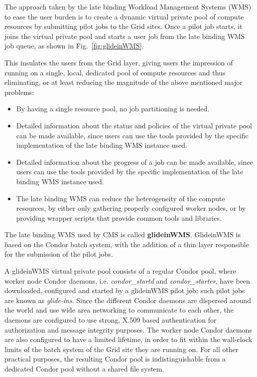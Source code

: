 \documentclass[a4paper]{jpconf}
\begin{document}
The approach taken by the late binding Workload Management Systems (WMS) to ease the user burden is 
to create a dynamic virtual private pool of compute resources by submitting pilot jobs to the Grid sites.
Once a pilot job starts, it joins the virtual private pool and starts a user job from the late binding WMS job queue, 
as shown in Fig.~\ref{fig:glideinWMS}.

This insulates the users from the Grid layer, giving users
the impression of running on a single, local, dedicated pool of compute resources
and thus eliminating, or at least reducing the magnitude of the above mentioned major problems:
\begin {itemize}
\item 
By having a single resource pool, no job partitioning is needed.
\item
Detailed information about the status and policies of the virtual private pool can be made available, 
since users can use the tools provided by the specific implementation of the late binding WMS instance used.
\item 
Detailed information about the progress of a job can be made available,
since users can use the tools provided by the specific implementation of the late binding WMS instance used.
\item
The late binding WMS can reduce the heterogeneity of the compute resources, 
by either only gathering properly configured worker nodes,
or by providing wrapper scripts that provide common tools and libraries.
\end{itemize}

The late binding WMS used by CMS is called \textbf{glideinWMS}. GlideinWMS is based on the Condor batch system, 
with the addition of a thin layer responsible for the submission of the pilot jobs.

A glideinWMS virtual private pool consists of a regular Condor pool, 
where worker node Condor daemons, i.e. \emph{condor\_startd} and \emph{condor\_starter}, 
have been downloaded, configured and started by a glideinWMS pilot job; such pilot jobs are known as \emph{glide-ins}. 
Since the different Condor daemons are dispersed around the world and use wide area networking to communicate to each other,
the daemons are configured to use strong, X.509 based authentication for authorization and message integrity purposes.
The worker node Condor daemons are also configured to have a limited lifetime, in order to fit within the wall-clock limits 
of the batch system of the Grid site they are running on.
For all other practical purposes, the resulting Condor pool is indistinguishable from a dedicated Condor pool without a shared file system.
\end{document}
